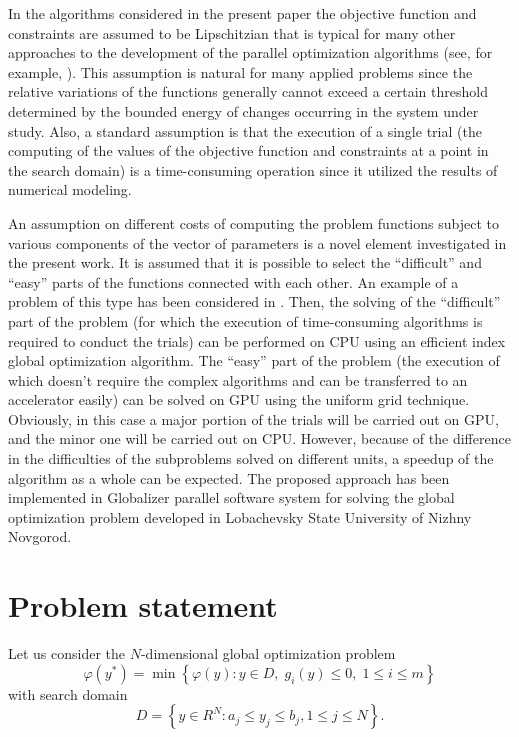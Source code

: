 \documentclass[a4paper]{jpconf}
\begin{document}
In the algorithms considered in the present paper the objective function and constraints are assumed to be Lipschitzian that is typical for many other approaches to the development of the parallel optimization algorithms (see, for example, \cite{Jones,Zilinskas,Evtushenko2009,Evtushenko2014}). This assumption is natural for many applied problems since the relative variations of the functions generally cannot exceed a certain threshold determined by the bounded energy of changes occurring in the system under study. Also, a standard assumption is that the execution of a single trial (the computing of the values of the objective function and constraints at a point in the search domain) is a time-consuming operation since it 
utilized the results of numerical modeling. 

An assumption on different costs of computing the problem functions subject to 
various components of the vector of parameters is a novel element investigated in the present work. 
It is assumed that it is possible to select the ``difficult'' and ``easy'' parts 
of the functions connected with each other. An example of a problem of this type has been considered in \cite{Strongin2017}.
Then, the solving of the ``difficult'' part of the problem (for which the execution of time-consuming algorithms is required to conduct the trials) can be performed on CPU using an efficient index global optimization algorithm. The ``easy'' part of the problem (the execution of which doesn't require the complex algorithms 
and can be transferred to an accelerator easily) can be solved on GPU using 
the uniform grid technique. Obviously, in this case a major portion of the trials 
will be carried out on GPU, and the minor one will be carried out on CPU. However, 
because of the difference in the difficulties of the subproblems solved on 
different units, a speedup of the algorithm as a whole can be expected. 
The proposed approach has been implemented in Globalizer parallel software 
system for solving the global optimization problem developed in Lobachevsky 
State University of Nizhny Novgorod. 

\section{Problem statement}

Let us consider the $N$-dimensional global optimization problem
\begin{equation}\label{problem}
\varphi(y^\ast)=\min{\left\{\varphi(y): y \in D, \; g_i(y)\leq 0, \; 1 \leq i 
\leq m\right\}}
\end{equation}
with search domain
\[
D=\left\{y\in R^N: a_j\leq y_j \leq b_j, 1\leq j \leq N \right\}.
\]
\end{document}
